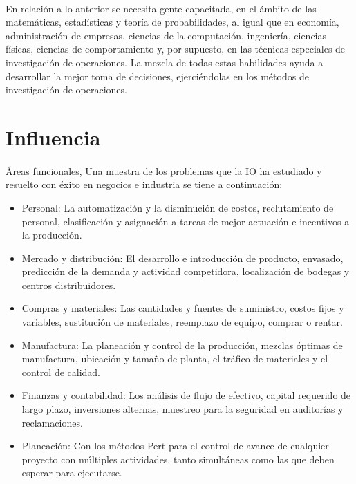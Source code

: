 \documentclass[12pt, a4paper,spanish]{article}
\begin{document}
		\paragraph{}
		En relación a lo anterior se necesita gente capacitada, en el ámbito de las matemáticas, estadísticas y teoría de probabilidades, al igual que en economía, administración de empresas, ciencias de la computación, ingeniería, ciencias físicas, ciencias de comportamiento y, por supuesto, en las técnicas especiales de investigación de operaciones. La mezcla de todas estas habilidades ayuda a desarrollar la mejor toma de decisiones, ejerciéndolas en los métodos de investigación de operaciones.\cite{gestiopolis_IO}



	\section{Influencia}
		\paragraph{}
		Áreas funcionales, Una muestra de los problemas que la IO ha estudiado y resuelto con éxito en negocios e industria se tiene a continuación:

		\begin{itemize}

			\item Personal: La automatización y la disminución de costos, reclutamiento de personal, clasificación y asignación a tareas de mejor actuación e incentivos a la producción.\cite{wikipedia_IO}

			\item Mercado y distribución: El desarrollo e introducción de producto, envasado, predicción de la demanda y actividad competidora, localización de bodegas y centros distribuidores.\cite{wikipedia_IO}

			\item Compras y materiales: Las cantidades y fuentes de suministro, costos fijos y variables, sustitución de materiales, reemplazo de equipo, comprar o rentar.\cite{wikipedia_IO}

			\item Manufactura: La planeación y control de la producción, mezclas óptimas de manufactura, ubicación y tamaño de planta, el tráfico de materiales y el control de calidad.\cite{wikipedia_IO}

			\item Finanzas y contabilidad: Los análisis de flujo de efectivo, capital requerido de largo plazo, inversiones alternas, muestreo para la seguridad en auditorías y reclamaciones.\cite{wikipedia_IO}

			\item Planeación: Con los métodos Pert para el control de avance de cualquier proyecto con múltiples actividades, tanto simultáneas como las que deben esperar para ejecutarse.\cite{wikipedia_IO}

		\end{itemize}
\end{document}
